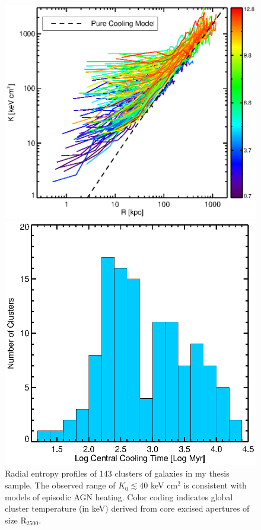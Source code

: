 \documentclass[11pt]{article}
\begin{document}
\clearpage
\begin{figure}[t]
    \begin{minipage}[t]{0.5\linewidth}
        \centering
	\includegraphics*[width=\textwidth, trim=28mm 8mm 30mm 10mm, clip]{splots}
        \caption{\small Radial entropy profiles of 143 clusters of
	galaxies in my thesis sample. The observed range of $K_0 \lesssim
	40$ keV cm$^2$ is consistent with models of episodic AGN
	heating. Color coding indicates global cluster temperature (in keV)
	derived from core excised apertures of size R$_{2500}$.}
	\label{fig:splots}
    \end{minipage}
    \hspace{0.1in}
    \begin{minipage}[t]{0.5\linewidth}
        \centering
        \includegraphics*[width=\textwidth, trim=28mm 8mm 30mm 10mm, clip]{tcool}

\end{minipage}
\end{figure}
\end{document}
